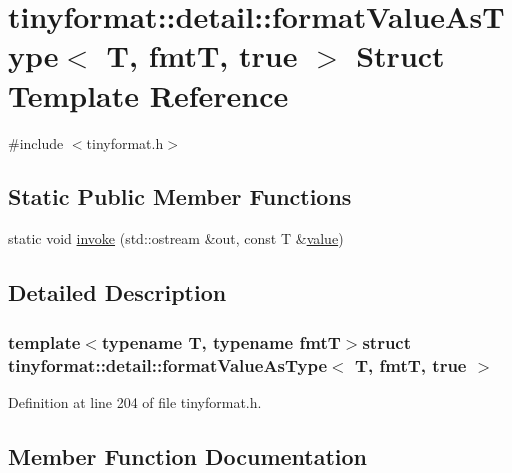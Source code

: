 \hypertarget{structtinyformat_1_1detail_1_1format_value_as_type_3_01_t_00_01fmt_t_00_01true_01_4}{}\section{tinyformat\+:\+:detail\+:\+:format\+Value\+As\+Type$<$ T, fmt\+T, true $>$ Struct Template Reference}
\label{structtinyformat_1_1detail_1_1format_value_as_type_3_01_t_00_01fmt_t_00_01true_01_4}


{\ttfamily \#include $<$tinyformat.\+h$>$}

\subsection*{Static Public Member Functions}
\begin{DoxyCompactItemize}
\item 
static void \hyperlink{structtinyformat_1_1detail_1_1format_value_as_type_3_01_t_00_01fmt_t_00_01true_01_4_a7680bc0f7b6b5eee0e27c494812fb667}{invoke} (std\+::ostream \&out, const T \&\hyperlink{cache_8cc_a0f61d63b009d0880a89c843bd50d8d76}{value})
\end{DoxyCompactItemize}


\subsection{Detailed Description}
\subsubsection*{template$<$typename T, typename fmt\+T$>$struct tinyformat\+::detail\+::format\+Value\+As\+Type$<$ T, fmt\+T, true $>$}



Definition at line 204 of file tinyformat.\+h.



\subsection{Member Function Documentation}
\hypertarget{structtinyformat_1_1detail_1_1format_value_as_type_3_01_t_00_01fmt_t_00_01true_01_4_a7680bc0f7b6b5eee0e27c494812fb667}{}
